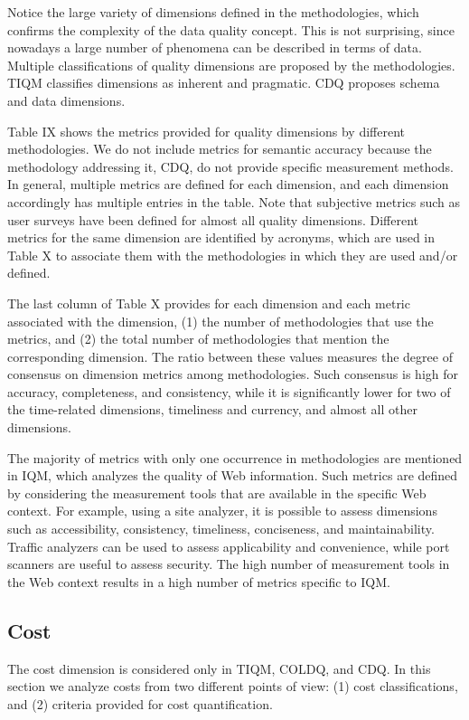 \documentclass[pdftex,english,oribibl]{llncs}
\begin{document}
    Notice the large variety of dimensions defined in the methodologies, which confirms the complexity of the data quality concept. This is not surprising, since nowadays a large number of phenomena can be described in terms of data. Multiple classifications of quality dimensions are proposed by the methodologies. TIQM classifies dimensions as inherent and pragmatic.
    CDQ proposes schema and data dimensions.

    Table IX shows the metrics provided for quality dimensions by different methodologies.
    We do not include metrics for semantic accuracy because the methodology addressing it, CDQ, do not provide specific measurement methods.
    In general, multiple metrics are defined for each dimension, and each dimension accordingly has multiple entries in the table.
    Note that subjective metrics such as user surveys have been defined for almost all quality dimensions.
    Different metrics for the same dimension are identified by acronyms, which are used in Table X to associate them with the methodologies in which they are used and/or defined.

    The last column of Table X provides for each dimension and each metric associated with the dimension, (1) the number of methodologies that use the metrics, and (2) the total number of methodologies that mention the corresponding dimension.
    The ratio between these values measures the degree of consensus on dimension metrics among methodologies.
    Such consensus is high for accuracy, completeness, and consistency, while it is significantly lower for two of the time-related dimensions, timeliness and currency, and almost all other dimensions.

    The majority of metrics with only one occurrence in methodologies are mentioned in IQM, which analyzes the quality of Web information.
    Such metrics are defined by considering the measurement tools that are available in the specific Web context.
    For example, using a site analyzer, it is possible to assess dimensions such as accessibility, consistency, timeliness, conciseness, and maintainability.
    Traffic analyzers can be used to assess applicability and convenience, while port scanners are useful to assess security.
    The high number of measurement tools in the Web context results in a high number of metrics specific to IQM.

    \subsection{Cost}
    The cost dimension is considered only in TIQM, COLDQ, and CDQ.
    In this section we analyze costs from two different points of view: (1) cost classifications, and (2) criteria provided for cost quantification.
\end{document}
